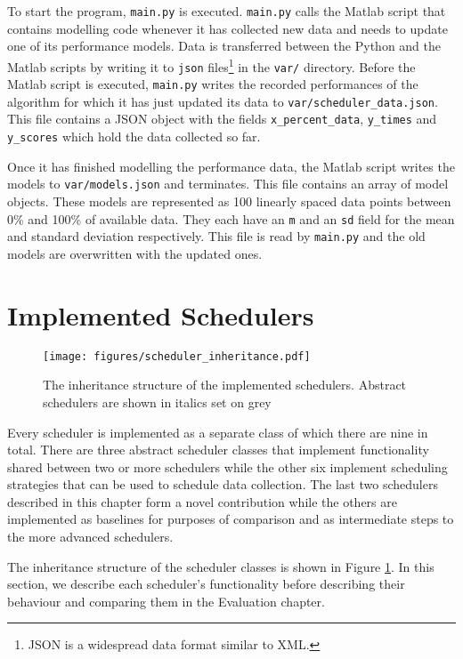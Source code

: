 \documentclass[a4paper,12pt,twoside,openright]{report}
\begin{document}
To start the program, \texttt{main.py} is executed. \texttt{main.py} calls the Matlab script that contains modelling code whenever it has collected new data and needs to update one of its performance models. Data is transferred between the Python and the Matlab scripts by writing it to \texttt{json} files\footnote{JSON is a widespread data format similar to XML.} in the \texttt{var/} directory.  Before the Matlab script is executed, \texttt{main.py} writes the recorded performances of the algorithm for which it has just updated its data to \texttt{var/scheduler\_data.json}. This file contains a JSON object with the fields \texttt{x\_percent\_data}, \texttt{y\_times} and \texttt{y\_scores} which hold the data collected so far.

Once it has finished modelling the performance data, the Matlab script writes the models to \texttt{var/models.json} and terminates. This file contains an array of model objects. These models are represented as 100 linearly spaced data points between 0\% and 100\% of available data. They each have an \texttt{m} and an \texttt{sd} field for the mean and standard deviation respectively. This file is read by \texttt{main.py} and the old models are overwritten with the updated ones.


\section{Implemented Schedulers}
\begin{figure}
    \centerline{\texttt{[image: figures/scheduler\_inheritance.pdf]}}
  \caption{The inheritance structure of the implemented schedulers. Abstract schedulers are shown in italics set on grey}
    \label{schedulerinheritance}
\end{figure}

Every scheduler is implemented as a separate class of which there are nine in total. There are three abstract scheduler classes that implement functionality shared between two or more schedulers while the other six implement scheduling strategies that can be used to schedule data collection. The last two schedulers described in this chapter form a novel contribution while the others are implemented as baselines for purposes of comparison and as intermediate steps to the more advanced schedulers.

The inheritance structure of the scheduler classes is shown in Figure \ref{schedulerinheritance}. In this section, we describe each scheduler's functionality before describing their behaviour and comparing them in the Evaluation chapter.
\end{document}
